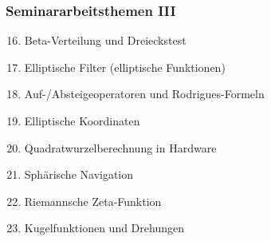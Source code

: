 %
%
%
\begin{frame}
\frametitle{Seminararbeitsthemen III}
\begin{enumerate}[<+->]
\setcounter{enumi}{15}
\item Beta-Verteilung und Dreieckstest
\item Elliptische Filter (elliptische Funktionen)
\item Auf-/Absteigeoperatoren und Rodrigues-Formeln
\item Elliptische Koordinaten 
\item Quadratwurzelberechnung in Hardware
\item Sphärische Navigation
\item Riemannsche Zeta-Funktion
\item Kugelfunktionen und Drehungen
\end{enumerate}
\end{frame}

